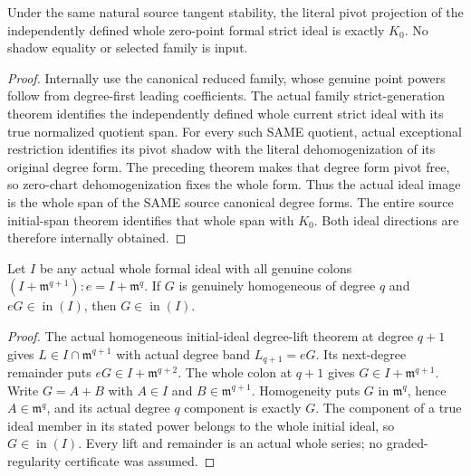 \begin{theorem}
\label{hir:actual-zero-point-tangent-stable-strict-shadow-dictionary}
\leanok
Under the same natural source tangent stability, the literal pivot
projection of the independently defined whole zero-point formal strict
ideal is exactly $K_0$. No shadow equality or selected family is input.
\end{theorem}
\begin{proof}
Internally use the canonical reduced family, whose genuine point powers
follow from degree-first leading coefficients. The actual family
strict-generation theorem identifies the independently defined whole
current strict ideal with its true normalized quotient span. For every
such SAME quotient, actual exceptional restriction identifies its pivot
shadow with the literal dehomogenization of its original degree form.
The preceding theorem makes that degree form pivot free, so zero-chart
dehomogenization fixes the whole form. Thus the actual ideal image is
the whole span of the SAME source canonical degree forms. The entire
source initial-span theorem identifies that whole span with $K_0$.
Both ideal directions are therefore internally obtained.
\end{proof}

\begin{theorem}
\label{hir:actual-current-colons-homogeneous-initial-pivot-cancellation}
\leanok
Let $I$ be any actual whole formal ideal with all genuine colons
$(I+\mathfrak m^{q+1}):e=I+\mathfrak m^q$. If $G$ is genuinely
homogeneous of degree $q$ and $eG\in\operatorname{in}(I)$, then
$G\in\operatorname{in}(I)$.
\end{theorem}
\begin{proof}
The actual homogeneous initial-ideal degree-lift theorem at degree
$q+1$ gives $L\in I\cap\mathfrak m^{q+1}$ with actual degree band
$L_{q+1}=eG$. Its next-degree remainder puts
$eG\in I+\mathfrak m^{q+2}$. The whole colon at $q+1$ gives
$G\in I+\mathfrak m^{q+1}$. Write $G=A+B$ with $A\in I$ and
$B\in\mathfrak m^{q+1}$. Homogeneity puts $G$ in
$\mathfrak m^q$, hence $A\in\mathfrak m^q$, and its actual degree
$q$ component is exactly $G$. The component of a true ideal member
in its stated power belongs to the whole initial ideal, so
$G\in\operatorname{in}(I)$. Every lift and remainder is an actual
whole series; no graded-regularity certificate was assumed.
\end{proof}

